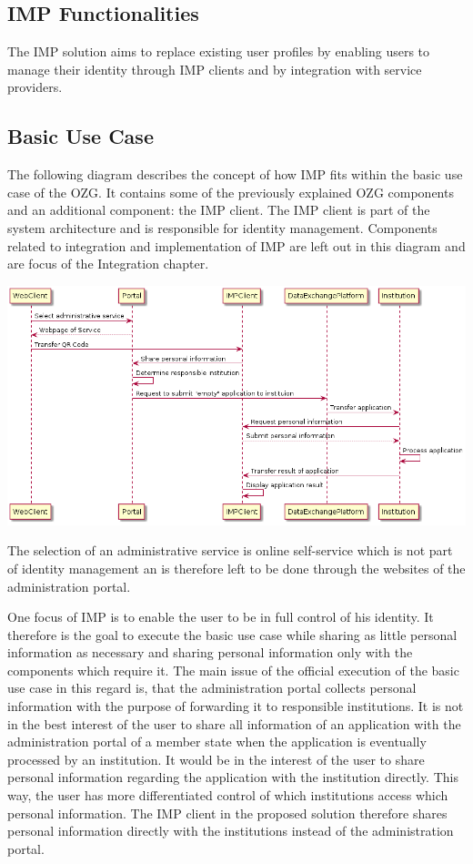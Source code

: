 \documentclass[
     12pt,         %
     a4paper,      %
     BCOR=10mm,version=first,     %
     DIV=14,version=first,        %
     ]{scrreprt}
\begin{document}
\subsection{IMP Functionalities}

The IMP solution aims to replace existing user profiles by enabling users to manage their identity through IMP clients and by integration with service providers.

\subsection{Basic Use Case}

The following diagram describes the concept of how IMP fits within the basic use case of the OZG. It contains some of the previously explained OZG components and an additional component: the IMP client. The IMP client is part of the system architecture and is responsible for identity management. Components related to integration and implementation of IMP are left out in this diagram and are focus of the Integration chapter. 

\includegraphics[width=15cm]{Basic Use Case IMP.png}

The selection of an administrative service is online self-service which is not part of identity management an is therefore left to be done through the websites of the administration portal. 

One focus of IMP is to enable the user to be in full control of his identity. It therefore is the goal to execute the basic use case while sharing as little personal information as necessary and sharing personal information only with the components which require it. The main issue of the official execution of the basic use case in this regard is, that the administration portal collects personal information with the purpose of forwarding it to responsible institutions. It is not in the best interest of the user to share all information of an application with the administration portal of a member state when the application is eventually processed by an institution. It would be in the interest of the user to share personal information regarding the application with the institution directly. This way, the user has more differentiated control of which institutions access which personal information. The IMP client in the proposed solution therefore shares personal information directly with the institutions instead of the administration portal.
\end{document}
